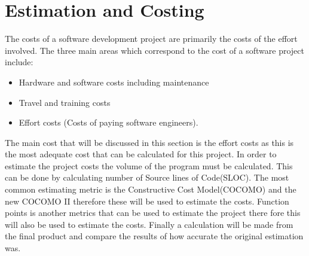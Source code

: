 \section{Estimation and Costing} 
\label{sec:estimation_and_costing}

The costs of a software development project are primarily the costs of the effort involved. The three main areas which correspond to the cost of a software project include:

\begin{itemize}
	\item Hardware and software costs including maintenance
	\item Travel and training costs
	\item Effort costs (Costs of paying software engineers).
\end{itemize}

The main cost that will be discussed in this section is the effort costs as this is the most adequate cost that can be calculated for this project. In order to estimate the project costs the volume of the program must be calculated. This can be done by calculating number of Source lines of Code(SLOC). The most common estimating metric is the Constructive Cost Model(COCOMO) and the new COCOMO II therefore these will be used to estimate the costs. Function points is another metrics that can be used to estimate the project there fore this will also be used to estimate the costs. Finally a calculation will be made from the final product and compare the results of how accurate the original estimation was.

